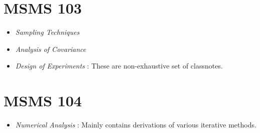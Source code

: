\documentclass[11pt, a4paper]{article}
\begin{document}
\section{MSMS 103}

\begin{itemize}
\item \textit{Sampling Techniques}

\item \textit{Analysis of Covariance}
	
\item \textit{Design of Experiments} : These are non-exhaustive set of classnotes.
\end{itemize}

\section{MSMS 104}

\begin{itemize}
\item \textit{Numerical Analysis} : Mainly contains derivations of various iterative methods.
\end{itemize}
\end{document}
